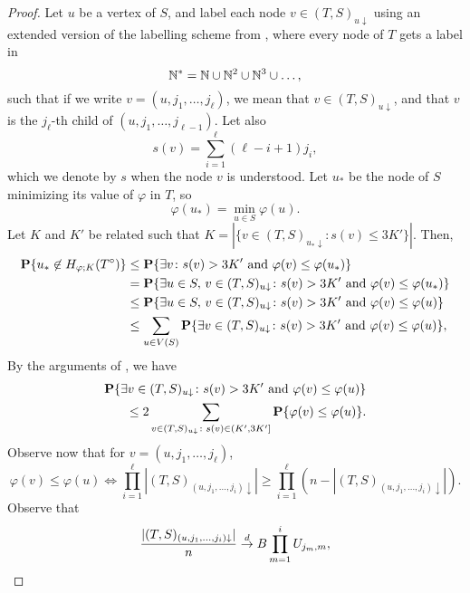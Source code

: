 \begin{proof}
  Let $u$ be a vertex of $S$, and label each node
  $v \in (T, S)_{u \downarrow}$ using an extended version of the
  labelling scheme from \cite{finding-adam}, where every node of $T$
  gets a label in
  \[
    \N^* = \N \cup \N^2 \cup \N^3 \cup \dots ,
  \]
  such that if we write $v = (u, j_1, \dots, j_\ell)$, we mean that
  $v \in (T, S)_{u \downarrow}$, and that $v$ is the $j_\ell$-th child
  of $(u, j_1, \dots, j_{\ell - 1})$. Let also
  \[
    s(v) = \sum_{i = 1}^\ell (\ell - i + 1) j_i ,
  \]
  which we denote by $s$ when the node $v$ is understood. Let $u_*$ be
  the node of $S$ minimizing its value of $\varphi$ in $T$, so
  \[
    \varphi(u_*) = \min_{u \in S} \varphi(u) .
  \]
  Let $K$ and $K'$ be related such that $K = |\{v \in (T, S)_{u_* \downarrow} \colon s(v) \le 3 K'\}|$. Then,
  \begin{align}
    \Pr\{u_* \not\in H_{\varphi; K}(T^\circ)\} &\le \Pr\{\exists v \colon s(v) > 3K' \text{ and } \varphi(v) \le \varphi(u_*) \} \notag \\
                                             &= \Pr\{\exists u \in S, \, v \in (T, S)_{u \downarrow} \colon s(v) > 3K' \text{ and } \varphi(v) \le \varphi(u_*)\} \notag \\
                                               &\le \Pr\{\exists u \in S, \, v \in (T, S)_{u \downarrow} \colon s(v) > 3K' \text{ and } \varphi(v) \le \varphi(u)\} \notag \\
                                             &\le \sum_{u \in V(S)} \Pr\{\exists v \in (T, S)_{u \downarrow} \colon s(v) > 3K' \text{ and } \varphi(v) \le \varphi(u)\} ,
  \end{align}
  By the arguments of \cite[Page 9, Equation (9)]{finding-adam}, we have
  \begin{align}
    \Pr\{\exists v \in (T, S)_{u \downarrow} \colon s(v) > 3K' \text{ and } \varphi(v) \le \varphi(u)\} \notag \\
    \qquad \le 2 \sum_{v \in (T, S)_{u \downarrow} \colon s(v) \in (K', 3K']} \Pr\{\varphi(v) \le \varphi(u)\} . \eqlabel{union-bound}
  \end{align}
  Observe now that for $v = (u, j_1, \dots, j_\ell)$,
  \[
    \varphi(v) \le \varphi(u) \iff \prod_{i = 1}^{\ell} |(T, S)_{(u, j_1, \dots, j_i) \downarrow}| \ge \prod_{i = 1}^{\ell} (n - |(T, S)_{(u, j_1, \dots, j_i) \downarrow}|) .
  \]
  Observe that
  \begin{equation}
    \frac{|(T, S)_{(u, j_1, \dots, j_i) \downarrow}|}{n} \overset{d}{\to} B \prod_{m = 1}^i U_{j_m, m} , \eqlabel{conv-dist-sub}

\end{equation}
\end{proof}
